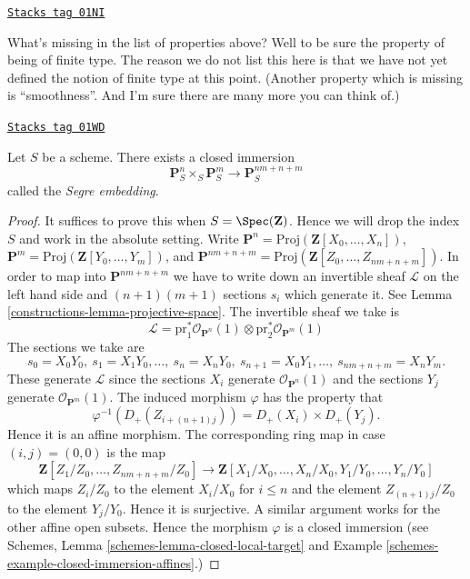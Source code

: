 \begin{remark}
\label{constructions-remark-missing-finite-type}
\href{https://stacks.math.columbia.edu/tag/01NI}{\texttt{Stacks tag 01NI}}

What's missing in the list of properties above? Well to be sure the property
of being of finite type. The reason we do not list this here is that we have
not yet defined the notion of finite type at this point. (Another property
which is missing is ``smoothness''. And I'm sure there are many more you can
think of.)
\end{remark}

\begin{lemma}

\label{constructions-lemma-segre-embedding}
\href{https://stacks.math.columbia.edu/tag/01WD}{\texttt{Stacks tag 01WD}}

Let $S$ be a scheme. There exists a closed immersion
$$
\mathbf{P}^n_S \times_S \mathbf{P}^m_S
\longrightarrow
\mathbf{P}^{nm + n + m}_S
$$
called the {\it Segre embedding}.
\end{lemma}

\begin{proof}

It suffices to prove this when $S = \Spec(\mathbf{Z})$.
Hence we will drop the index $S$ and work in the absolute setting.
Write $\mathbf{P}^n = \text{Proj}(\mathbf{Z}[X_0, \ldots, X_n])$,
$\mathbf{P}^m = \text{Proj}(\mathbf{Z}[Y_0, \ldots, Y_m])$,
and
$\mathbf{P}^{nm + n + m} =
\text{Proj}(\mathbf{Z}[Z_0, \ldots, Z_{nm + n + m}])$.
In order to map into $\mathbf{P}^{nm + n + m}$ we have to
write down an invertible sheaf $\mathcal{L}$ on the left hand
side and $(n + 1)(m + 1)$ sections $s_i$ which generate it.
See Lemma \ref{constructions-lemma-projective-space}.
The invertible sheaf we take is
$$
\mathcal{L} =
\text{pr}_1^*\mathcal{O}_{\mathbf{P}^n}(1)
\otimes
\text{pr}_2^*\mathcal{O}_{\mathbf{P}^m}(1)
$$
The sections we take are
$$
s_0 = X_0Y_0, \ s_1 = X_1Y_0, \ldots, \ s_n = X_nY_0,
\ s_{n + 1} = X_0Y_1, \ldots, \ s_{nm + n + m} = X_nY_m.
$$
These generate $\mathcal{L}$ since the sections $X_i$ generate
$\mathcal{O}_{\mathbf{P}^n}(1)$ and the sections $Y_j$ generate
$\mathcal{O}_{\mathbf{P}^m}(1)$. The induced morphism
$\varphi$ has the property that
$$
\varphi^{-1}(D_{+}(Z_{i + (n + 1)j})) = D_{+}(X_i) \times D_{+}(Y_j).
$$
Hence it is an affine morphism. The corresponding ring map in case
$(i, j) = (0, 0)$ is the map
$$
\mathbf{Z}[Z_1/Z_0, \ldots, Z_{nm + n + m}/Z_0]
\longrightarrow
\mathbf{Z}[X_1/X_0, \ldots, X_n/X_0, Y_1/Y_0, \ldots, Y_n/Y_0]
$$
which maps $Z_i/Z_0$ to the element $X_i/X_0$ for $i \leq n$ and
the element $Z_{(n + 1)j}/Z_0$ to the element $Y_j/Y_0$. Hence it
is surjective. A similar argument works for the other affine
open subsets. Hence the morphism $\varphi$ is a closed immersion
(see Schemes, Lemma \ref{schemes-lemma-closed-local-target} and
Example \ref{schemes-example-closed-immersion-affines}.)
\end{proof}

